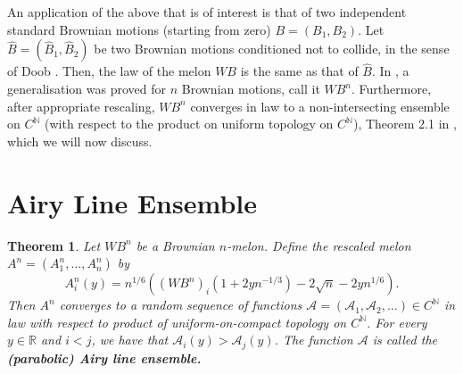 \documentclass[12pt]{report}
\theoremstyle{plain}
\newtheorem{theorem}{Theorem}[section]
\begin{document}
An application of the above that is of interest is that of two independent standard Brownian motions (starting from zero) \(B = (B_1, B_2)\).  Let \(\hat{B}=(\hat{B}_1, \hat{B}_2)\) be two Brownian motions conditioned not to collide, in the sense of Doob \cite{sarkar2021brownian}. Then, the law of the melon \(WB\) is the same as that of \(\hat{B}\). In \cite{o2002representation}, a generalisation was proved for \(n\) Brownian motions, call it \(WB^n\). Furthermore, after appropriate rescaling, \(WB^n\) converges in law to a non-intersecting ensemble on \(C^{\mathbb{N}}\) (with respect to the product on uniform topology on \(C^{\mathbb{N}}\)), Theorem 2.1 in \cite{DOV}, which we will now discuss. 

\section{Airy Line Ensemble}\label{Airy Line}

\begin{theorem}\label{thm: Melon scaling}
    Let \(WB^n\)  be a Brownian \(n\)-melon. Define the rescaled melon \(A^n = (A^n_1, \dots, A^n_n)\)
by
\[
A^n_i(y) = n^{1/6} \left((WB^n)_i(1 + 2yn^{-1/3}) - 2\sqrt{n} - 2yn^{1/6} \right).
\]
Then \(A^n\) converges to a random sequence of functions \(\mathcal{A} = (\mathcal{A}_1, \mathcal{A}_2, \dots) \in C^\mathbb{N}\) in law with respect to product of uniform-on-compact topology on \(C^\mathbb{N}\). For every \(y \in \mathbb{R}\) and \(i < j\), we have that \(\mathcal{A}_i(y) > \mathcal{A}_j(y)\). The function \(\mathcal{A}\) is called the \textbf{(parabolic) Airy line ensemble.}
\end{theorem}%
\end{document}
